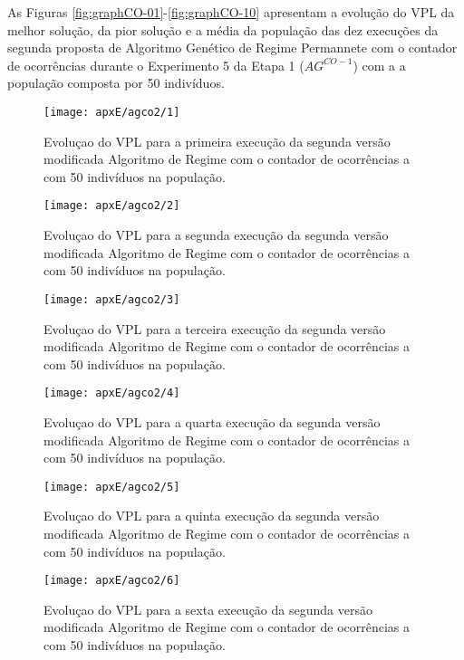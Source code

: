 As Figuras \ref{fig:graphCO-01}-\ref{fig:graphCO-10} apresentam a evolução do VPL da melhor solução, da pior solução e a média da população das dez execuções da segunda proposta de Algoritmo Genético de Regime Permannete com o contador de ocorrências durante o Experimento 5 da Etapa 1 ($AG^{CO-1}$) com a a população composta por 50 indivíduos.

\begin{figure}[H]
\centering
\texttt{[image: apxE/agco2/1]}
\caption{Evoluçao do VPL para a primeira execução da segunda versão modificada Algoritmo de Regime com o contador de ocorrências a com 50 indivíduos na população.}
\label{fig:graphCO2-01}
\end{figure}

\begin{figure}[H]
\centering
\texttt{[image: apxE/agco2/2]}
\caption{Evoluçao do VPL para a segunda execução da segunda versão modificada Algoritmo de Regime com o contador de ocorrências a com 50 indivíduos na população.}
\label{fig:graphCO2-02}
\end{figure}

\begin{figure}[H]
\centering
\texttt{[image: apxE/agco2/3]}
\caption{Evoluçao do VPL para a terceira execução da segunda versão modificada Algoritmo de Regime com o contador de ocorrências a com 50 indivíduos na população.}
\label{fig:graphCO2-03}
\end{figure}

\begin{figure}[H]
\centering
\texttt{[image: apxE/agco2/4]}
\caption{Evoluçao do VPL para a quarta execução da segunda versão modificada Algoritmo de Regime com o contador de ocorrências a com 50 indivíduos na população.}
\label{fig:graphCO2-04}
\end{figure}

\begin{figure}[H]
\centering
\texttt{[image: apxE/agco2/5]}
\caption{Evoluçao do VPL para a quinta execução da segunda versão modificada Algoritmo de Regime com o contador de ocorrências a com 50 indivíduos na população.}
\label{fig:graphCO2-05}
\end{figure}

\begin{figure}[H]
\centering
\texttt{[image: apxE/agco2/6]}
\caption{Evoluçao do VPL para a sexta execução da segunda versão modificada Algoritmo de Regime com o contador de ocorrências a com 50 indivíduos na população.}
\label{fig:graphCO2-06}
\end{figure}

